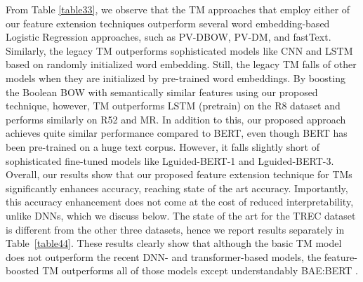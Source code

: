 \documentclass[11pt]{article}
\begin{document}
\par From Table \ref{table33}, we observe that the TM approaches that employ either of our feature extension techniques outperform several word embedding-based Logistic Regression approaches, such as PV-DBOW, PV-DM, and fastText. Similarly, the legacy TM outperforms sophisticated models like CNN and LSTM based on randomly initialized word embedding. Still, the legacy TM falls of other models when they are initialized by pre-trained word embeddings. By boosting the Boolean BOW with semantically similar features using our proposed technique, however, TM outperforms LSTM (pretrain) on the R8 dataset and performs similarly on R52 and MR. In addition to this, our proposed approach achieves quite similar performance compared to BERT, even though BERT has been pre-trained on a huge text corpus. However, it falls slightly short of sophisticated fine-tuned models like Lguided-BERT-1 and Lguided-BERT-3. Overall, our results show that our proposed feature extension technique for TMs significantly enhances accuracy, reaching state of the art accuracy. Importantly, this accuracy enhancement does not come at the cost of reduced interpretability, unlike DNNs, which we discuss below. The state of the art for the TREC dataset is different from the other three datasets, hence we report results  separately in Table~\ref{table44}. These results clearly show that although the basic TM model does not outperform the recent DNN- and transformer-based models, the feature-boosted TM outperforms all of those models except understandably BAE:BERT \cite{garg2020bae}.
\end{document}
